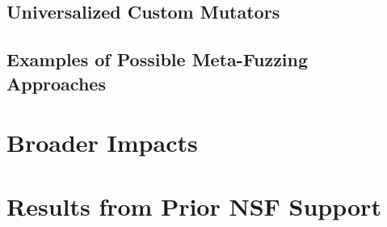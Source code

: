 \documentclass[numbers]{proposalnsf}
\begin{document}
\subsection{Universalized Custom Mutators}
   
\subsection{Examples of Possible Meta-Fuzzing Approaches}


\section{Broader Impacts}

\section{Results from Prior NSF Support}




\newpage
%


\end{document}
